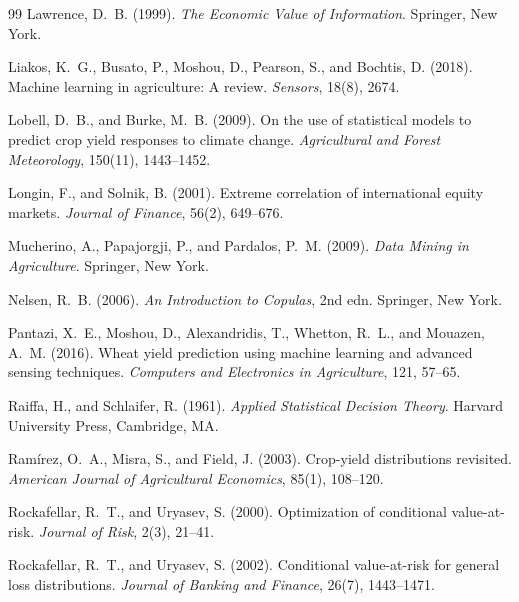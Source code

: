 \documentclass[12pt,review,authoryear]{elsarticle}
\numberwithin{equation}{section}
\begin{document}
\begin{thebibliography}{99}
Lawrence, D.~B. (1999).
\newblock \emph{The Economic Value of Information}.
\newblock Springer, New York.

Liakos, K.~G., Busato, P., Moshou, D., Pearson, S., and Bochtis, D. (2018).
\newblock Machine learning in agriculture: A review.
\newblock \emph{Sensors}, 18(8), 2674.

Lobell, D.~B., and Burke, M.~B. (2009).
\newblock On the use of statistical models to predict crop yield responses to climate change.
\newblock \emph{Agricultural and Forest Meteorology}, 150(11), 1443--1452.

Longin, F., and Solnik, B. (2001).
\newblock Extreme correlation of international equity markets.
\newblock \emph{Journal of Finance}, 56(2), 649--676.

Mucherino, A., Papajorgji, P., and Pardalos, P.~M. (2009).
\newblock \emph{Data Mining in Agriculture}.
\newblock Springer, New York.

Nelsen, R.~B. (2006).
\newblock \emph{An Introduction to Copulas}, 2nd edn.
\newblock Springer, New York.

Pantazi, X.~E., Moshou, D., Alexandridis, T., Whetton, R.~L., and Mouazen, A.~M. (2016).
\newblock Wheat yield prediction using machine learning and advanced sensing techniques.
\newblock \emph{Computers and Electronics in Agriculture}, 121, 57--65.

Raiffa, H., and Schlaifer, R. (1961).
\newblock \emph{Applied Statistical Decision Theory}.
\newblock Harvard University Press, Cambridge, MA.

Ram\'{i}rez, O.~A., Misra, S., and Field, J. (2003).
\newblock Crop-yield distributions revisited.
\newblock \emph{American Journal of Agricultural Economics}, 85(1), 108--120.

Rockafellar, R.~T., and Uryasev, S. (2000).
\newblock Optimization of conditional value-at-risk.
\newblock \emph{Journal of Risk}, 2(3), 21--41.

Rockafellar, R.~T., and Uryasev, S. (2002).
\newblock Conditional value-at-risk for general loss distributions.
\newblock \emph{Journal of Banking and Finance}, 26(7), 1443--1471.


\end{thebibliography}
\end{document}
